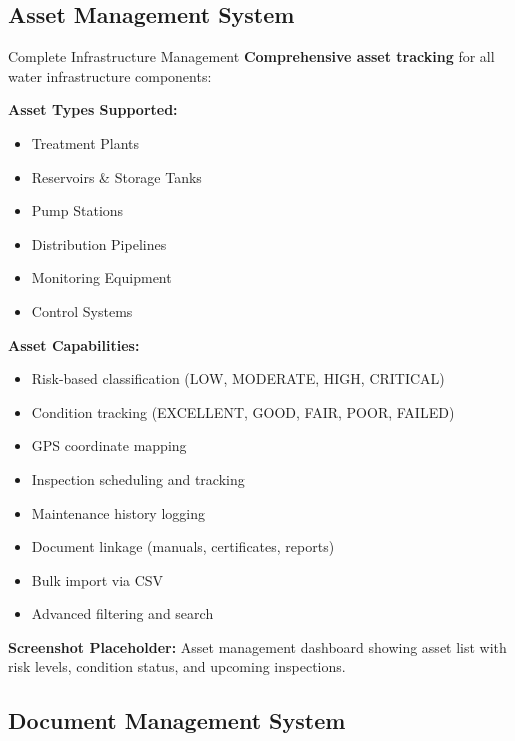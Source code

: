 \documentclass[11pt,a4paper]{article}
\begin{document}
\subsection{Asset Management System}

\begin{featurebox}{Complete Infrastructure Management}
    \textbf{Comprehensive asset tracking} for all water infrastructure components:

    \vspace{0.5cm}
    \textbf{Asset Types Supported:}
    \begin{itemize}[itemsep=0.2em]
        \item Treatment Plants
        \item Reservoirs \& Storage Tanks
        \item Pump Stations
        \item Distribution Pipelines
        \item Monitoring Equipment
        \item Control Systems
    \end{itemize}

    \vspace{0.5cm}
    \textbf{Asset Capabilities:}
    \begin{itemize}[itemsep=0.2em]
        \item Risk-based classification (LOW, MODERATE, HIGH, CRITICAL)
        \item Condition tracking (EXCELLENT, GOOD, FAIR, POOR, FAILED)
        \item GPS coordinate mapping
        \item Inspection scheduling and tracking
        \item Maintenance history logging
        \item Document linkage (manuals, certificates, reports)
        \item Bulk import via CSV
        \item Advanced filtering and search
    \end{itemize}
\end{featurebox}

\vspace{0.5cm}

\textbf{Screenshot Placeholder:} Asset management dashboard showing asset list with risk levels, condition status, and upcoming inspections.

\newpage

\subsection{Document Management System}
\end{document}
